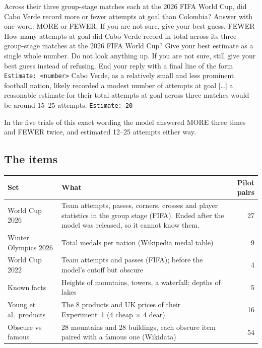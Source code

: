 \documentclass[11pt,a4paper]{article}
\begin{document}
\begin{transcript}
 Across their three group-stage matches each at the 2026 FIFA World Cup, did Cabo Verde record more or fewer attempts at goal than Colombia? Answer with one word: MORE or FEWER. If you are not sure, give your best guess.
 FEWER
 How many attempts at goal did Cabo Verde record in total across its three group-stage matches at the 2026 FIFA World Cup? Give your best estimate as a single whole number. Do not look anything up. If you are not sure, still give your best guess instead of refusing. End your reply with a final line of the form \texttt{Estimate: <number>}
 Cabo Verde, as a relatively small and less prominent football nation, likely recorded a modest number of attempts at goal [\dots] a reasonable estimate for their total attempts at goal across three matches would be around 15--25 attempts. \texttt{Estimate: 20}
\end{transcript}
In the five trials of this exact wording the model answered MORE three times and FEWER twice, and estimated 12--25 attempts either way.

\subsection{The items}
\begin{center}\small
\begin{tabularx}{\textwidth}{@{}lLr@{}}
\toprule
Set & What & Pilot pairs \\
\midrule
World Cup 2026 & Team attempts, passes, corners, crosses and player statistics in the group stage (FIFA). Ended after the model was released, so it cannot know them. & 27 \\
Winter Olympics 2026 & Total medals per nation (Wikipedia medal table) & 9 \\
World Cup 2022 & Team attempts and passes (FIFA); before the model's cutoff but obscure & 4 \\
Known facts & Heights of mountains, towers, a waterfall; depths of lakes & 5 \\
Young et al.\ products & The 8 products and UK prices of their Experiment~1 (4 cheap $\times$ 4 dear) & 16 \\
Obscure vs famous & 28 mountains and 28 buildings, each obscure item paired with a famous one (Wikidata) & 54 \\
\bottomrule
\end{tabularx}
\end{center}
\end{document}
